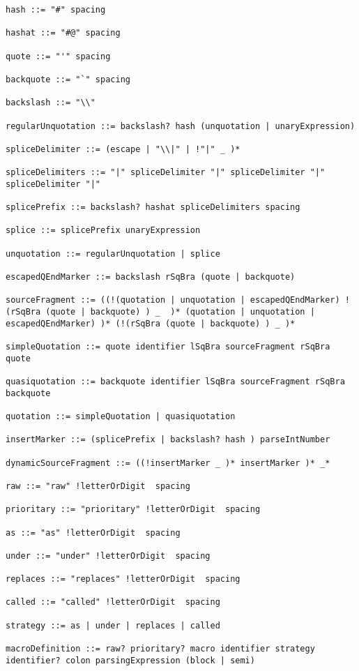 \begin{lstlisting}[breaklines=true]
hash ::= "#" spacing

hashat ::= "#@" spacing

quote ::= "'" spacing

backquote ::= "`" spacing

backslash ::= "\\"

regularUnquotation ::= backslash? hash (unquotation | unaryExpression)

spliceDelimiter ::= (escape | "\\|" | !"|" _ )*

spliceDelimiters ::= "|" spliceDelimiter "|" spliceDelimiter "|" spliceDelimiter "|"

splicePrefix ::= backslash? hashat spliceDelimiters spacing

splice ::= splicePrefix unaryExpression

unquotation ::= regularUnquotation | splice

escapedQEndMarker ::= backslash rSqBra (quote | backquote)

sourceFragment ::= ((!(quotation | unquotation | escapedQEndMarker) !(rSqBra (quote | backquote) ) _  )* (quotation | unquotation | escapedQEndMarker) )* (!(rSqBra (quote | backquote) ) _ )*

simpleQuotation ::= quote identifier lSqBra sourceFragment rSqBra quote

quasiquotation ::= backquote identifier lSqBra sourceFragment rSqBra backquote

quotation ::= simpleQuotation | quasiquotation

insertMarker ::= (splicePrefix | backslash? hash ) parseIntNumber

dynamicSourceFragment ::= ((!insertMarker _ )* insertMarker )* _*

raw ::= "raw" !letterOrDigit  spacing

prioritary ::= "prioritary" !letterOrDigit  spacing

as ::= "as" !letterOrDigit  spacing

under ::= "under" !letterOrDigit  spacing

replaces ::= "replaces" !letterOrDigit  spacing

called ::= "called" !letterOrDigit  spacing

strategy ::= as | under | replaces | called

macroDefinition ::= raw? prioritary? macro identifier strategy identifier? colon parsingExpression (block | semi)

\end{lstlisting}
